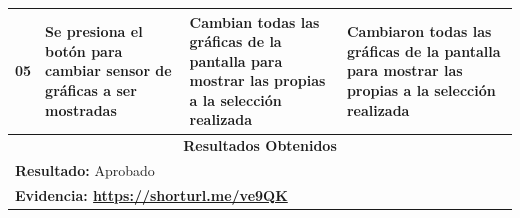 \begin{minipage}{0.95\textwidth}
\begin{center}
\begin{tabularx}{\textwidth}{ | p{2cm} | X | X | X |}
        \hline
        05 & Se presiona el botón para cambiar sensor de gráficas a ser mostradas & Cambian todas las gráficas de la pantalla para mostrar las propias a la selección realizada & Cambiaron todas las gráficas de la pantalla para mostrar las propias a la selección realizada \\
        \hline
        \multicolumn{4}{|c|}{\textbf{Resultados Obtenidos}} \\
        \hline
        \multicolumn{4}{|l|}{\textbf{Resultado:} Aprobado} \\
        \hline
        \multicolumn{4}{|l|}{\textbf{Evidencia: \url{https://shorturl.me/ve9QK} }} \\
        \hline
     \end{tabularx}
    \label{CP007}
    \end{center}
    \end{minipage}
    
